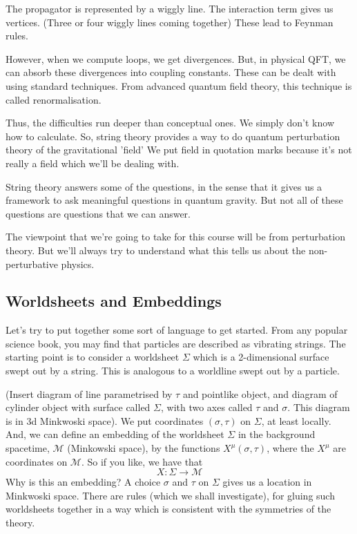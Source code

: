\documentclass[11pt, oneside]{article}   	%
\theoremstyle{slanted}
\begin{document}
The propagator is represented by a wiggly line. 
The interaction term gives us vertices. (Three or four 
wiggly lines coming together) 
These lead to Feynman rules.

However, when we compute loops, 
we get divergences. But, in physical QFT, 
we can absorb these divergences into coupling constants. 
These can be dealt with using standard techniques. From
advanced quantum field theory, this technique 
is called renormalisation. 

Thus, the difficulties run deeper than conceptual ones. 
We simply don't know how to calculate. 
So, string theory 
provides a way to do quantum perturbation theory 
of the gravitational 'field' 
We put field in quotation marks because it's 
not really a field which we'll be dealing with. 

String theory answers some of the questions, 
in the sense that it gives 
us a framework to ask 
meaningful questions in quantum gravity. 
But not all of these questions are questions that 
we can answer. 

The viewpoint that  we're going to 
take for this course will be from 
perturbation theory. But we'll always 
try to understand what this tells us about the 
non-perturbative physics. 

\subsection{Worldsheets and Embeddings}
Let's try 
to put together some sort of language 
to get started. From any popular science book, 
you may find that particles are described 
as vibrating strings. 
The starting point is to consider a 
worldsheet $ \Sigma $ which is a 
2-dimensional surface swept out by a string. 
This is analogous to a 
worldline swept out by a particle.

(Insert diagram of line parametrised by $ \tau $  and pointlike 
object, and diagram of cylinder object with surface called 
$ \Sigma $, with two axes called $ \tau $ and $ \sigma $.   This 
diagram is in 3d Minkwoski space). 
We put coordinates $ \left( \sigma , \tau  \right)  $
on $ \Sigma $, at least locally. 
And, we can define an embedding of the worldsheet $ \Sigma $ 
in the background spacetime, $ \mathcal{ M } $ (Minkowski space),
by the functions $ X ^{ \mu } \left( \sigma, \tau  \right)  $, 
where the $ X ^ \mu $ are coordinates on 
$ \mathcal{ M }  $. So if you like, we have that 
\[
X : \Sigma \to \mathcal{ M }
\] Why is this an embedding? 
A choice $ \sigma $ and $ \tau $ on $ \Sigma $ gives 
us a location in Minkwoski space. 
There are rules (which we shall investigate), 
for gluing such worldsheets together 
in a way which is consistent with 
the symmetries of the theory. 
\end{document}
